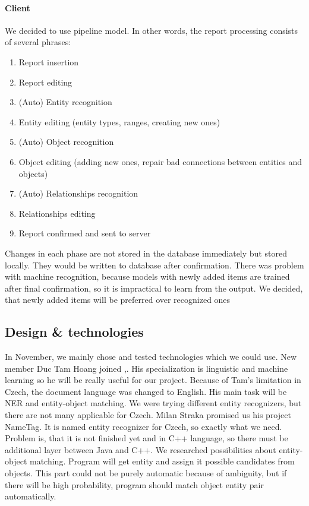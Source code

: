 \paragraph{Client}
We decided to use pipeline model. %
In other words, the report processing consists of several phrases:

\begin{enumerate}
\item Report insertion
\item Report editing
\item (Auto) Entity recognition
\item Entity editing (entity types, ranges, creating new ones)
\item (Auto) Object recognition
\item Object editing (adding new ones, repair bad connections between entities and objects)
\item (Auto) Relationships recognition
\item Relationships editing
\item Report confirmed and sent to server
\end{enumerate}

Changes in each phase are not stored in the database immediately but
stored locally. They would be written to database after confirmation. There was problem with
machine recognition, because models with newly added items are trained after final 
confirmation, so it is impractical to learn from the output. 
We decided, that newly added items will be preferred over recognized ones
 
\subsection{Design \& technologies}
In November, we mainly chose and tested technologies which we could use. New member Duc Tam Hoang joined \textan{},. His specialization is
linguistic and machine learning so he will be really useful for our project.
Because of Tam's limitation in Czech, the document language was changed to English.
His main task will be NER and entity-object matching. We were trying different
entity recognizers, but there are not many applicable for Czech. Milan Straka
promised us his project NameTag. It is named entity recognizer for Czech, so
exactly what we need. Problem is, that it is not finished yet and in C++
language, so there must be additional layer between Java and C++.
We researched possibilities about entity-object matching. Program will get
entity and assign it possible candidates from objects. This part could not be
purely automatic because of ambiguity, but if there will be high probability,
program should match object entity pair automatically.

